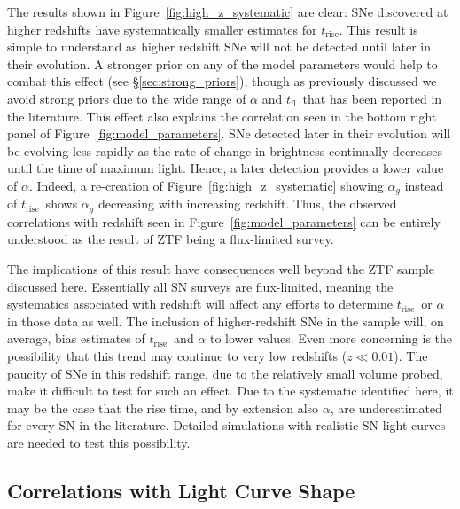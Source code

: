 \documentclass[twocolumn]{./aastex63}
\newcommand{\tfl}{$t_\mathrm{fl}$}
\newcommand{\trise}{$t_\mathrm{rise}$}
\begin{document}
The results shown in Figure~\ref{fig:high_z_systematic} are clear: SNe
discovered at higher redshifts have systematically smaller estimates for
\trise. This result is simple to understand as higher redshift SNe will not be
detected until later in their evolution. A stronger prior on any of the model
parameters would help to combat this effect (see \S\ref{sec:strong_priors}),
though as previously discussed we avoid strong priors due to the wide range of
$\alpha$ and \tfl\ that has been reported in the literature. This effect also
explains the correlation seen in the bottom right panel of
Figure~\ref{fig:model_parameters}. SNe detected later in their evolution will
be evolving less rapidly as the rate of change in brightness continually
decreases until the time of maximum light. Hence, a later detection provides a
lower value of $\alpha$. Indeed, a re-creation of
Figure~\ref{fig:high_z_systematic} showing $\alpha_g$ instead of \trise\ shows
$\alpha_g$ decreasing with increasing redshift. Thus, the observed
correlations with redshift seen in Figure~\ref{fig:model_parameters} can be
entirely understood as the result of ZTF being a flux-limited survey.

The implications of this result have consequences well beyond the ZTF sample
discussed here. Essentially all SN surveys are flux-limited, meaning the
systematics associated with redshift will affect any efforts to determine
\trise\ or $\alpha$ in those data as well. The inclusion of higher-redshift
SNe in the sample will, on average, bias estimates of \trise\ and $\alpha$ to
lower values. Even more concerning is the possibility that this trend may
continue to very low redshifts ($z \ll 0.01$). The paucity of SNe in this
redshift range, due to the relatively small volume probed, make it difficult
to test for such an effect. Due to the systematic identified here, it may be
the case that the rise time, and by extension also $\alpha$, are
underestimated for every SN in the literature. Detailed simulations with
realistic SN light curves are needed to test this possibility.

\subsection{Correlations with Light Curve Shape}
\end{document}
